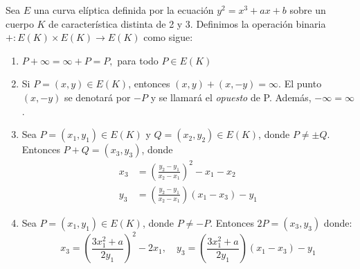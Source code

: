 \begin{definicion}
\label{def:ley de grupo}
Sea $E$ una curva elíptica definida por la ecuación $y^2 = x^3 + a x + b$ sobre un cuerpo $K$ de característica distinta de 2 y 3. Definimos la operación binaria $+: E(K) \times E(K) \to E(K)$ como sigue:
\begin{enumerate}[label=\alph*)]
	\item $P + \infty = \infty + P = P,$ para todo $P \in E(K)$
	\item Si $P = (x, y) \in E(K)$, entonces $(x, y) + (x, -y) = \infty$. El punto $(x, -y)$ se denotará por $-P$ y se llamará el \emph{opuesto} de P. Además, $- \infty = \infty$.
	\item Sea $P = (x_1, y_1) \in E(K)$ y $Q = (x_2, y_2) \in E(K)$, donde $P \neq \pm Q$. Entonces $P + Q = (x_3, y_3)$, donde
	\begin{align*}
		x_3 &= \left(\frac{y_2 - y_1}{x_2 - x_1}\right)^2 - x_1 - x_2 \\
		y_3 &= \left(\frac{y_2 - y_1}{x_2 - x_1}\right) (x_1 - x_3) - y_1
	\end{align*}
	\item Sea $P = (x_1, y_1) \in E(K)$, donde $P \neq  -P$. Entonces $2 P = (x_3, y_3)$ donde:
	$$
	x_3 = \left(\frac{3 x_1^2 + a}{2 y_1}\right)^2 - 2 x_1, \quad
	y_3 = \left(\frac{3 x_1^2 + a}{2 y_1}\right) (x_1 - x_3) - y_1
	$$
\end{enumerate}
\end{definicion}
